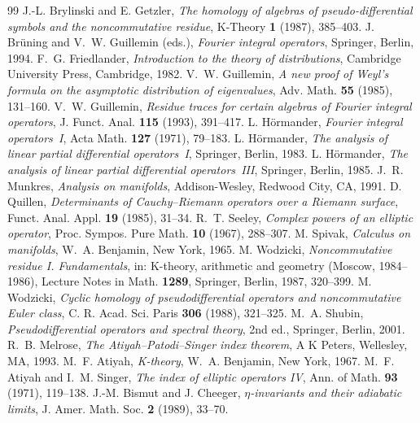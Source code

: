 \begin{thebibliography}{99}
 J.-L. Brylinski and E. Getzler, \emph{The homology of algebras of pseudo-differential symbols and the noncommutative residue}, K-Theory \textbf{1} (1987), 385--403.
 J. Br\"uning and V.~W. Guillemin (eds.), \emph{Fourier integral operators}, Springer, Berlin, 1994.
 F.~G. Friedlander, \emph{Introduction to the theory of distributions}, Cambridge University Press, Cambridge, 1982.
 V.~W. Guillemin, \emph{A new proof of Weyl's formula on the asymptotic distribution of eigenvalues}, Adv. Math. \textbf{55} (1985), 131--160.
 V.~W. Guillemin, \emph{Residue traces for certain algebras of Fourier integral operators}, J. Funct. Anal. \textbf{115} (1993), 391--417.
 L. H\"ormander, \emph{Fourier integral operators~I}, Acta Math. \textbf{127} (1971), 79--183.
 L. H\"ormander, \emph{The analysis of linear partial differential operators~I}, Springer, Berlin, 1983.
 L. H\"ormander, \emph{The analysis of linear partial differential operators~III}, Springer, Berlin, 1985.
 J.~R. Munkres, \emph{Analysis on manifolds}, Addison-Wesley, Redwood City, CA, 1991.
 D. Quillen, \emph{Determinants of Cauchy--Riemann operators over a Riemann surface}, Funct. Anal. Appl. \textbf{19} (1985), 31--34.
 R.~T. Seeley, \emph{Complex powers of an elliptic operator}, Proc. Sympos. Pure Math. \textbf{10} (1967), 288--307.
 M. Spivak, \emph{Calculus on manifolds}, W.~A. Benjamin, New York, 1965.
 M. Wodzicki, \emph{Noncommutative residue I. Fundamentals}, in: K-theory, arithmetic and geometry (Moscow, 1984--1986), Lecture Notes in Math. \textbf{1289}, Springer, Berlin, 1987, 320--399.
 M. Wodzicki, \emph{Cyclic homology of pseudodifferential operators and noncommutative Euler class}, C. R. Acad. Sci. Paris \textbf{306} (1988), 321--325.
 M.~A. Shubin, \emph{Pseudodifferential operators and spectral theory}, 2nd ed., Springer, Berlin, 2001.
 R.~B. Melrose, \emph{The Atiyah--Patodi--Singer index theorem}, A K Peters, Wellesley, MA, 1993.
 M.~F. Atiyah, \emph{K-theory}, W.~A. Benjamin, New York, 1967.
 M.~F. Atiyah and I.~M. Singer, \emph{The index of elliptic operators IV}, Ann. of Math. \textbf{93} (1971), 119--138.
 J.-M. Bismut and J. Cheeger, \emph{$\eta$-invariants and their adiabatic limits}, J. Amer. Math. Soc. \textbf{2} (1989), 33--70.

\end{thebibliography}
